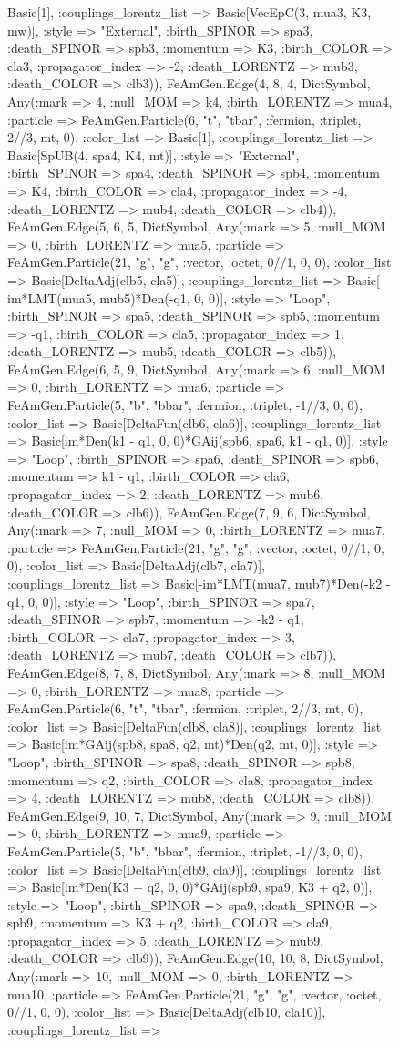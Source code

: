 \documentclass{revtex4}
\begin{document}
\begin{figure}[!htb]
\begin{center}
{Basic[1], :couplings_lorentz_list => Basic[VecEpC(3, mua3, K3, mw)], :style => "External", :birth_SPINOR => spa3, :death_SPINOR => spb3, :momentum => K3, :birth_COLOR => cla3, :propagator_index => -2, :death_LORENTZ => mub3, :death_COLOR => clb3)), FeAmGen.Edge(4, 8, 4, Dict{Symbol, Any}(:mark => 4, :null_MOM => k4, :birth_LORENTZ => mua4, :particle => FeAmGen.Particle(6, "t", "tbar", :fermion, :triplet, 2//3, mt, 0), :color_list => Basic[1], :couplings_lorentz_list => Basic[SpUB(4, spa4, K4, mt)], :style => "External", :birth_SPINOR => spa4, :death_SPINOR => spb4, :momentum => K4, :birth_COLOR => cla4, :propagator_index => -4, :death_LORENTZ => mub4, :death_COLOR => clb4)), FeAmGen.Edge(5, 6, 5, Dict{Symbol, Any}(:mark => 5, :null_MOM => 0, :birth_LORENTZ => mua5, :particle => FeAmGen.Particle(21, "g", "g", :vector, :octet, 0//1, 0, 0), :color_list => Basic[DeltaAdj(clb5, cla5)], :couplings_lorentz_list => Basic[-im*LMT(mua5, mub5)*Den(-q1, 0, 0)], :style => "Loop", :birth_SPINOR => spa5, :death_SPINOR => spb5, :momentum => -q1, :birth_COLOR => cla5, :propagator_index => 1, :death_LORENTZ => mub5, :death_COLOR => clb5)), FeAmGen.Edge(6, 5, 9, Dict{Symbol, Any}(:mark => 6, :null_MOM => 0, :birth_LORENTZ => mua6, :particle => FeAmGen.Particle(5, "b", "bbar", :fermion, :triplet, -1//3, 0, 0), :color_list => Basic[DeltaFun(clb6, cla6)], :couplings_lorentz_list => Basic[im*Den(k1 - q1, 0, 0)*GAij(spb6, spa6, k1 - q1, 0)], :style => "Loop", :birth_SPINOR => spa6, :death_SPINOR => spb6, :momentum => k1 - q1, :birth_COLOR => cla6, :propagator_index => 2, :death_LORENTZ => mub6, :death_COLOR => clb6)), FeAmGen.Edge(7, 9, 6, Dict{Symbol, Any}(:mark => 7, :null_MOM => 0, :birth_LORENTZ => mua7, :particle => FeAmGen.Particle(21, "g", "g", :vector, :octet, 0//1, 0, 0), :color_list => Basic[DeltaAdj(clb7, cla7)], :couplings_lorentz_list => Basic[-im*LMT(mua7, mub7)*Den(-k2 - q1, 0, 0)], :style => "Loop", :birth_SPINOR => spa7, :death_SPINOR => spb7, :momentum => -k2 - q1, :birth_COLOR => cla7, :propagator_index => 3, :death_LORENTZ => mub7, :death_COLOR => clb7)), FeAmGen.Edge(8, 7, 8, Dict{Symbol, Any}(:mark => 8, :null_MOM => 0, :birth_LORENTZ => mua8, :particle => FeAmGen.Particle(6, "t", "tbar", :fermion, :triplet, 2//3, mt, 0), :color_list => Basic[DeltaFun(clb8, cla8)], :couplings_lorentz_list => Basic[im*GAij(spb8, spa8, q2, mt)*Den(q2, mt, 0)], :style => "Loop", :birth_SPINOR => spa8, :death_SPINOR => spb8, :momentum => q2, :birth_COLOR => cla8, :propagator_index => 4, :death_LORENTZ => mub8, :death_COLOR => clb8)), FeAmGen.Edge(9, 10, 7, Dict{Symbol, Any}(:mark => 9, :null_MOM => 0, :birth_LORENTZ => mua9, :particle => FeAmGen.Particle(5, "b", "bbar", :fermion, :triplet, -1//3, 0, 0), :color_list => Basic[DeltaFun(clb9, cla9)], :couplings_lorentz_list => Basic[im*Den(K3 + q2, 0, 0)*GAij(spb9, spa9, K3 + q2, 0)], :style => "Loop", :birth_SPINOR => spa9, :death_SPINOR => spb9, :momentum => K3 + q2, :birth_COLOR => cla9, :propagator_index => 5, :death_LORENTZ => mub9, :death_COLOR => clb9)), FeAmGen.Edge(10, 10, 8, Dict{Symbol, Any}(:mark => 10, :null_MOM => 0, :birth_LORENTZ => mua10, :particle => FeAmGen.Particle(21, "g", "g", :vector, :octet, 0//1, 0, 0), :color_list => Basic[DeltaAdj(clb10, cla10)], :couplings_lorentz_list => }
\end{center}
\end{figure}
\end{document}

